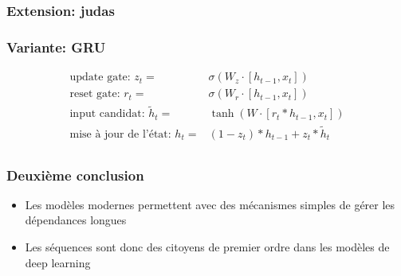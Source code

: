 \documentclass{formation}
\begin{document}
\begin{frame}
  \frametitle{Extension: judas}
  
\end{frame}

\begin{frame}
  \frametitle{Variante: GRU}
  
  \begin{align*}
    \text{update gate: } z_t         =           & \sigma(W_z\cdot [h_{t-1}, x_t])         \\
    \text{reset gate: }  r_t         =           & \sigma(W_r\cdot [h_{t-1}, x_t])         \\
    \text{input candidat: } \tilde{h}_t =        & \tanh(W \cdot [r_t * h_{t-1}, x_t])     \\
    \text{mise à jour de l'état: } h_t         = & (1 - z_t) * h_{t-1} + z_t * \tilde{h}_t \\
  \end{align*}
\end{frame}

\begin{frame}
  \frametitle{Deuxième conclusion}
  \begin{itemize}
  \item Les modèles modernes permettent avec des mécanismes simples de
    gérer les dépendances longues
  \item Les séquences sont donc des citoyens de premier ordre dans les
    modèles de deep learning
  \end{itemize}
\end{frame}

\begin{frame}[allowframebreaks]
  
\end{frame}
\end{document}
